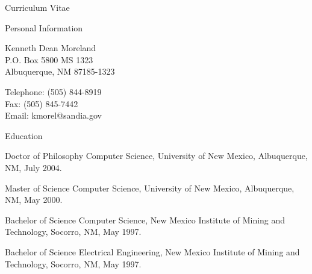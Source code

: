 \documentclass{article}
\date{February 11, 2013}
\begin{document}
  \raggedright

  \begin{cv}{Curriculum Vitae}
    \setlength{\cvlabelwidth}{.25in}
    \renewcommand*{\cvlabelfont}{\textsf}

    \begin{cvlist}{Personal Information}
      \item Kenneth Dean Moreland \\
        P.O. Box 5800  MS 1323 \\
        Albuquerque, NM  87185-1323
      \item Telephone: (505) 844-8919 \\
        Fax: (505) 845-7442 \\
        Email: kmorel@sandia.gov
    \end{cvlist}

    \begin{cvlist}{Education}
      \item[Doctor of Philosophy] Computer Science, University of New
        Mexico, Albuquerque, NM, July 2004.
      \item[Master of Science] Computer Science, University of New Mexico,
        Albuquerque, NM, May 2000.
      \item[Bachelor of Science] Computer Science, New Mexico Institute of
        Mining and Technology, Socorro, NM, May 1997.
      \item[Bachelor of Science] Electrical Engineering, New Mexico
        Institute of Mining and Technology, Socorro, NM, May 1997.
    \end{cvlist}


\end{cv}
\end{document}

